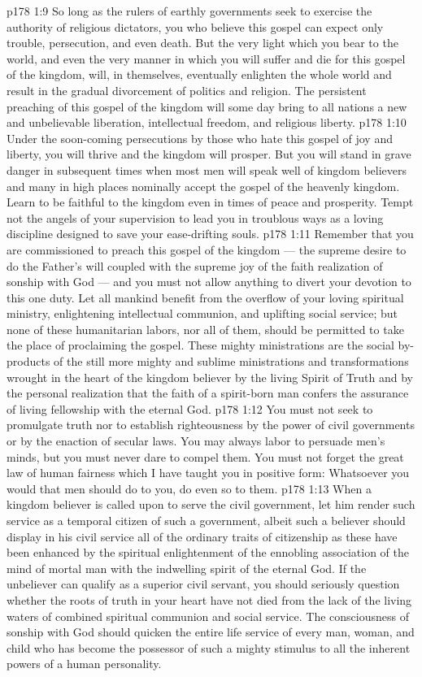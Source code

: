 \vs p178 1:9 So long as the rulers of earthly governments seek to exercise the authority of religious dictators, you who believe this gospel can expect only trouble, persecution, and even death. But the very light which you bear to the world, and even the very manner in which you will suffer and die for this gospel of the kingdom, will, in themselves, eventually enlighten the whole world and result in the gradual divorcement of politics and religion. The persistent preaching of this gospel of the kingdom will some day bring to all nations a new and unbelievable liberation, intellectual freedom, and religious liberty.
\vs p178 1:10 Under the soon\hyp{}coming persecutions by those who hate this gospel of joy and liberty, you will thrive and the kingdom will prosper. But you will stand in grave danger in subsequent times when most men will speak well of kingdom believers and many in high places nominally accept the gospel of the heavenly kingdom. Learn to be faithful to the kingdom even in times of peace and prosperity. Tempt not the angels of your supervision to lead you in troublous ways as a loving discipline designed to save your ease\hyp{}drifting souls.
\vs p178 1:11 Remember that you are commissioned to preach this gospel of the kingdom --- the supreme desire to do the Father’s will coupled with the supreme joy of the faith realization of sonship with God --- and you must not allow anything to divert your devotion to this one duty. Let all mankind benefit from the overflow of your loving spiritual ministry, enlightening intellectual communion, and uplifting social service; but none of these humanitarian labors, nor all of them, should be permitted to take the place of proclaiming the gospel. These mighty ministrations are the social by\hyp{}products of the still more mighty and sublime ministrations and transformations wrought in the heart of the kingdom believer by the living Spirit of Truth and by the personal realization that the faith of a spirit\hyp{}born man confers the assurance of living fellowship with the eternal God.
\vs p178 1:12 You must not seek to promulgate truth nor to establish righteousness by the power of civil governments or by the enaction of secular laws. You may always labor to persuade men’s minds, but you must never dare to compel them. You must not forget the great law of human fairness which I have taught you in positive form: Whatsoever you would that men should do to you, do even so to them.
\vs p178 1:13 When a kingdom believer is called upon to serve the civil government, let him render such service as a temporal citizen of such a government, albeit such a believer should display in his civil service all of the ordinary traits of citizenship as these have been enhanced by the spiritual enlightenment of the ennobling association of the mind of mortal man with the indwelling spirit of the eternal God. If the unbeliever can qualify as a superior civil servant, you should seriously question whether the roots of truth in your heart have not died from the lack of the living waters of combined spiritual communion and social service. The consciousness of sonship with God should quicken the entire life service of every man, woman, and child who has become the possessor of such a mighty stimulus to all the inherent powers of a human personality.
